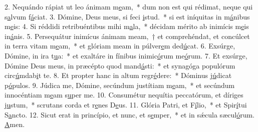 2. Nequándo rápiat ut leo ánimam m\uline{e}am,~* dum non est qui rédimat, neque qui s\uline{a}lvum f\uline{á}ciat.
3. Dómine, Deus meus, si feci \uline{i}stud.~* si est iníquitas in m\uline{á}nibus m\uline{e}is:
4. Si réddidi retribuéntibus mihi m\uline{a}la,~* décidam mérito ab inimícis m\uline{e}is in\uline{á}nis.
5. Persequátur inimícus ánimam meam,~† et comprehéndat, et concúlcet in terra vitam m\uline{e}am,~* et glóriam meam in púlver\uline{e}m ded\uline{ú}cat.
6. Exsúrge, Dómine, in ira t\uline{u}a:~* et exaltáre in fínibus inimic\uline{ó}rum me\uline{ó}rum.
7. Et exsúrge, Dómine Deus meus, in præcépto quod mand\uline{á}sti:~* et synagóga populórum circ\uline{ú}mdab\uline{i}t te.
8. Et propter hanc in altum regr\uline{é}dere:~* Dóminus j\uline{ú}dicat p\uline{ó}pulos.
9. Júdica me, Dómine, secúndum justítiam m\uline{e}am,~* et secúndum innocéntiam m\uline{e}am s\uline{u}per me.
10. Consumétur nequítia peccatórum, et díriges j\uline{u}stum,~* scrutans corda et r\uline{e}nes D\uline{e}us.
11. Glória Patri, et F\uline{í}lio,~* et Spir\uline{í}tui S\uline{a}ncto.
12. Sicut erat in princípio, et nunc, et s\uline{e}mper,~* et in sǽcula sæcul\uline{ó}rum. \uline{A}men.
